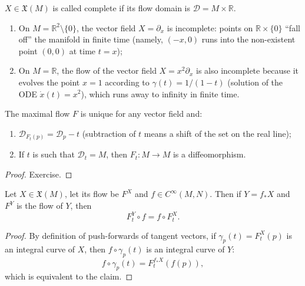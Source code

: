 \documentclass[english,letterpaper]{article}%
\numberwithin{equation}{section}
\numberwithin{figure}{section}
\numberwithin{table}{section}
\theoremstyle{definition}
\theoremstyle{definition}
\theoremstyle{definition}
\theoremstyle{plain}
\theoremstyle{plain}
\theoremstyle{plain}
\theoremstyle{plain}
\theoremstyle{remark}
\theoremstyle{remark}
\newcommand{\fX}{\mathfrak{X}}
\begin{document}
\begin{defn}
$X\in\fX(M)$ is called complete if its flow domain is $\mathcal{D}=M\times\mathbb{R}$. 
\end{defn}
\begin{example}
\begin{enumerate}
    \item On $M=\mathbb{R}^2\setminus\{0\}$, the vector field $X=\partial_x$ is incomplete: points on $\mathbb{R}\times\{0\}$ ``fall off'' the manifold in finite time (namely, $(-x,0)$ runs into the non-existent point $(0,0)$ at time $t=x$);
    \item On $M=\mathbb{R}$, the flow of the vector field $X=x^2\partial_x$ is also incomplete because it evolves the point $x=1$ according to $\gamma(t)=1/(1-t)$ (solution of the ODE $\dot x(t)=x^2$), which runs away to infinity in finite time.
\end{enumerate}
\end{example}

\begin{thm}
The maximal flow $F$ is unique for any vector field and:
\begin{enumerate}
    \item $\mathcal{D}_{F_t(p)}=\mathcal{D}_p-t$ (subtraction of $t$ means a shift of the set on the real line);
    \item If $t$ is such that $\mathcal{D}_t=M$, then $F_t:M\to M$ is a diffeomorphism.
\end{enumerate}
\end{thm}
\begin{proof}
Exercise.
\end{proof}

\begin{cor}
Let $X\in\fX(M)$, let its flow be $F^X$ and $f\in C^\infty(M,N)$. Then if $Y=f_\ast X$ and $F^Y$ is the flow of $Y$, then 
\[F^Y_t\circ f=f\circ F^X_t.\]
\end{cor}
\begin{proof}
By definition of push-forwards of tangent vectors, if $\gamma_p(t)=F_t^X(p)$ is an integral curve of $X$, then $f\circ \gamma_p(t)$ is an integral curve of $Y$:
\[f\circ \gamma_p(t)=F^{f_\ast X}_t(f(p)),\]
which is equivalent to the claim.
\end{proof}
\end{document}

